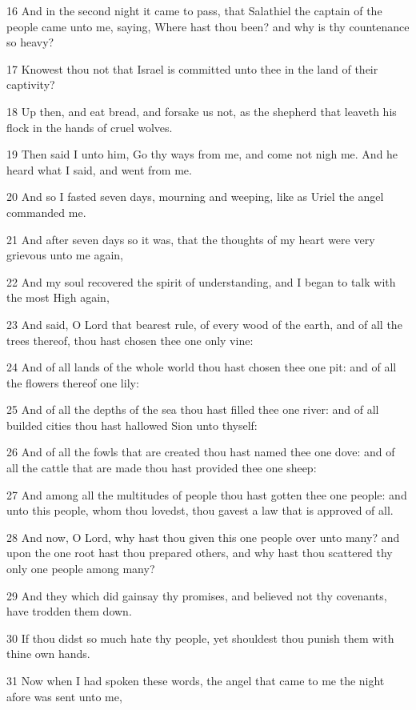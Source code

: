 \par 16 And in the second night it came to pass, that Salathiel the captain of the people came unto me, saying, Where hast thou been? and why is thy countenance so heavy?
\par 17 Knowest thou not that Israel is committed unto thee in the land of their captivity?
\par 18 Up then, and eat bread, and forsake us not, as the shepherd that leaveth his flock in the hands of cruel wolves.
\par 19 Then said I unto him, Go thy ways from me, and come not nigh me. And he heard what I said, and went from me.
\par 20 And so I fasted seven days, mourning and weeping, like as Uriel the angel commanded me.
\par 21 And after seven days so it was, that the thoughts of my heart were very grievous unto me again,
\par 22 And my soul recovered the spirit of understanding, and I began to talk with the most High again,
\par 23 And said, O Lord that bearest rule, of every wood of the earth, and of all the trees thereof, thou hast chosen thee one only vine:
\par 24 And of all lands of the whole world thou hast chosen thee one pit: and of all the flowers thereof one lily:
\par 25 And of all the depths of the sea thou hast filled thee one river: and of all builded cities thou hast hallowed Sion unto thyself:
\par 26 And of all the fowls that are created thou hast named thee one dove: and of all the cattle that are made thou hast provided thee one sheep:
\par 27 And among all the multitudes of people thou hast gotten thee one people: and unto this people, whom thou lovedst, thou gavest a law that is approved of all.
\par 28 And now, O Lord, why hast thou given this one people over unto many? and upon the one root hast thou prepared others, and why hast thou scattered thy only one people among many?
\par 29 And they which did gainsay thy promises, and believed not thy covenants, have trodden them down.
\par 30 If thou didst so much hate thy people, yet shouldest thou punish them with thine own hands.
\par 31 Now when I had spoken these words, the angel that came to me the night afore was sent unto me,
